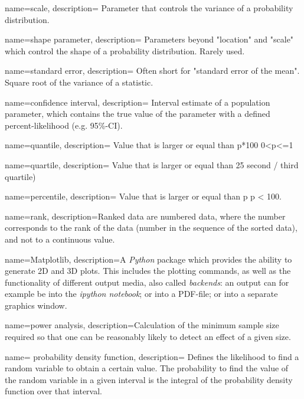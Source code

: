 {
    name=scale,
    description={ Parameter that controls the variance of a probability
    distribution.}
}

{
    name=shape parameter,
    description={ Parameters beyond "location" and "scale" which control the shape of a
    probability distribution. Rarely used.}
}

{
    name=standard error,
    description={ Often short for "standard error of the mean". Square root of the variance
    of a statistic.}
}

{
    name=confidence interval,
    description={ Interval estimate of a population parameter, which contains the true value
    of the parameter with a defined percent-likelihood (e.g. 95\%-CI).}
}

{
    name=quantile,
    description={ Value that is larger or equal than p*100%
    0<p<=1}
}

{
    name=quartile,
    description={ Value that is larger or equal than 25%
    second / third quartile)}
}

{
    name=percentile,
    description={ Value that is larger or equal than p%
    p < 100.}
}

{
    name=rank,
    description={Ranked data are numbered data, where the number corresponds to the rank of the data
    (number in the sequence of the sorted data), and not to a
    continuous value.}
}

{
        name=Matplotlib,
        description={A \emph{Python} package which provides the ability to generate 2D and 3D plots. This includes the plotting commands, as well as the functionality of different output media, also called \emph{backends}: an output can for example be into the \emph{ipython notebook}; or into a PDF-file; or into a separate graphics window.}
}

{
        name=power analysis,
        description={Calculation of the minimum sample size required so that one can be reasonably likely to detect an effect of a given size.}
}

{
    name= probability density function,
    description={ Defines the likelihood to find a random variable to obtain a certain
    value. The probability to find the value of the random variable in a given
    interval is the integral of the probability density function over that
    interval.}
}

